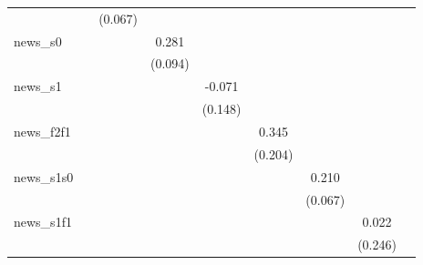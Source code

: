 {\begin{tabular}{l*{8}{c}}
            &                     &     (0.067)         &                     &                     &                     &                     &                     &                     \\
\addlinespace
news\_s0     &                     &                     &       0.281\sym{***}&                     &                     &                     &                     &                     \\
            &                     &                     &     (0.094)         &                     &                     &                     &                     &                     \\
\addlinespace
news\_s1     &                     &                     &                     &      -0.071         &                     &                     &                     &                     \\
            &                     &                     &                     &     (0.148)         &                     &                     &                     &                     \\
\addlinespace
news\_f2f1   &                     &                     &                     &                     &       0.345         &                     &                     &                     \\
            &                     &                     &                     &                     &     (0.204)         &                     &                     &                     \\
\addlinespace
news\_s1s0   &                     &                     &                     &                     &                     &       0.210\sym{***}&                     &                     \\
            &                     &                     &                     &                     &                     &     (0.067)         &                     &                     \\
\addlinespace
news\_s1f1   &                     &                     &                     &                     &                     &                     &       0.022         &                     \\
            &                     &                     &                     &                     &                     &                     &     (0.246)         &                     \\

\end{tabular}}
